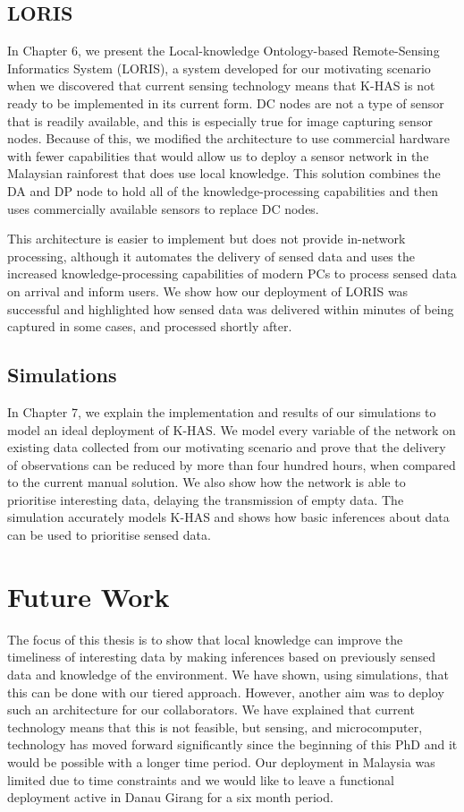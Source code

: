 \subsection{LORIS}
In Chapter 6, we present the Local-knowledge Ontology-based Remote-Sensing Informatics System (LORIS), a system developed for our motivating scenario when we discovered that current sensing technology means that K-HAS is not ready to be implemented in its current form. DC nodes are not a type of sensor that is readily available, and this is especially true for image capturing sensor nodes. Because of this, we modified the architecture to use commercial hardware with fewer capabilities that would allow us to deploy a sensor network in the Malaysian rainforest that does use local knowledge. This solution combines the DA and DP node to hold all of the knowledge-processing capabilities and then uses commercially available sensors to replace DC nodes. 

This architecture is easier to implement but does not provide in-network processing, although it automates the delivery of sensed data and uses the increased knowledge-processing capabilities of modern PCs to process sensed data on arrival and inform users. We show how our deployment of LORIS was successful and highlighted how sensed data was delivered within minutes of being captured in some cases, and processed shortly after. 
\subsection{Simulations}
In Chapter 7, we explain the implementation and results of our simulations to model an ideal deployment of K-HAS. We model every variable of the network on existing data collected from our motivating scenario and prove that the delivery of observations can be reduced by more than four hundred hours, when compared to the current manual solution. We also show how the network is able to prioritise interesting data, delaying the transmission of empty data. The simulation accurately models K-HAS and shows how basic inferences about data can be used to prioritise sensed data.
\section{Future Work}
The focus of this thesis is to show that local knowledge can improve the timeliness of interesting data by making inferences based on previously sensed data and knowledge of the environment. We have shown, using simulations, that this can be done with our tiered approach. However, another aim was to deploy such an architecture for our collaborators. We have explained that current technology means that this is not feasible, but sensing, and microcomputer, technology has moved forward significantly since the beginning of this PhD and it would be possible with a longer time period. Our deployment in Malaysia was limited due to time constraints and we would like to leave a functional deployment active in Danau Girang for a six month period. 

